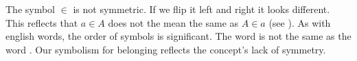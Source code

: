 The symbol $\in$ is not symmetric.
If we flip it left and right it looks different.
This reflects that $a \in A$ does not the mean the same as $A \in a$ (see ).
As with english words, the order of symbols is significant.
The word  is not the same as the word .
Our symbolism for belonging reflects the concept's lack of symmetry.



